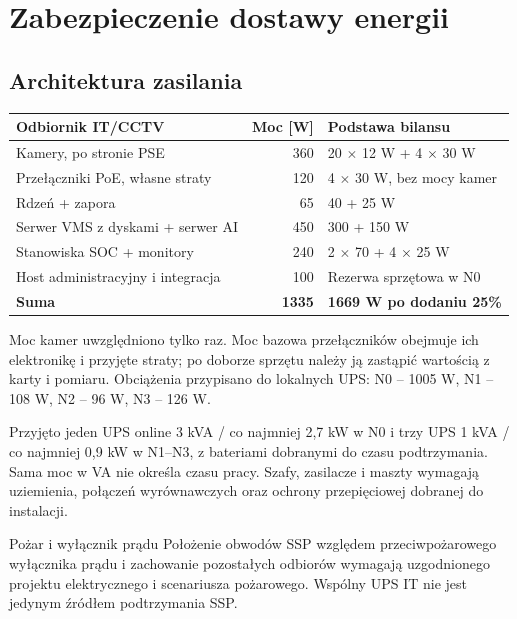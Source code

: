 \section{Zabezpieczenie dostawy energii}
\subsection{Architektura zasilania}
\begin{tabularx}{\linewidth}{@{}Y r Y@{}}
\toprule\textbf{Odbiornik IT/CCTV} & \textbf{Moc [W]} & \textbf{Podstawa bilansu}\\\midrule
Kamery, po stronie PSE & 360 & 20 $\times$ 12 W + 4 $\times$ 30 W\\
Przełączniki PoE, własne straty & 120 & 4 $\times$ 30 W, bez mocy kamer\\
Rdzeń + zapora & 65 & 40 + 25 W\\
Serwer VMS z dyskami + serwer AI & 450 & 300 + 150 W\\
Stanowiska SOC + monitory & 240 & 2 $\times$ 70 + 4 $\times$ 25 W\\
Host administracyjny i integracja & 100 & Rezerwa sprzętowa w N0\\\midrule
\textbf{Suma} & \textbf{1335} & \textbf{1669 W po dodaniu 25\%}\\\bottomrule
\end{tabularx}

Moc kamer uwzględniono tylko raz. Moc bazowa przełączników obejmuje ich elektronikę i przyjęte straty; po doborze sprzętu należy ją zastąpić wartością z karty i pomiaru. Obciążenia przypisano do lokalnych UPS: N0 -- 1005 W, N1 -- 108 W, N2 -- 96 W, N3 -- 126 W.

Przyjęto jeden UPS online 3 kVA / co najmniej 2,7 kW w N0 i trzy UPS 1 kVA / co najmniej 0,9 kW w N1--N3, z bateriami dobranymi do czasu podtrzymania. Sama moc w VA nie określa czasu pracy. Szafy, zasilacze i maszty wymagają uziemienia, połączeń wyrównawczych oraz ochrony przepięciowej dobranej do instalacji.

\begin{note}{Pożar i wyłącznik prądu}
Położenie obwodów SSP względem przeciwpożarowego wyłącznika prądu i zachowanie pozostałych odbiorów wymagają uzgodnionego projektu elektrycznego i scenariusza pożarowego. Wspólny UPS IT nie jest jedynym źródłem podtrzymania SSP.
\end{note}
